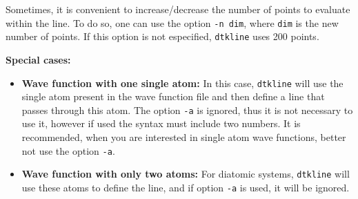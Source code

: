 Sometimes, it is convenient to increase/decrease the number of points to evaluate within the line. To do so, one can use the option \texttt{-n dim}, where \texttt{dim} is the new number of points. If this option is not especified, \texttt{dtkline} uses 200 points.

\textbf{Special cases:}
\begin{itemize}
   \item \textbf{Wave function with one single atom:} In this case, \texttt{dtkline} will use the single atom present in the wave function file and then define a line that passes through this atom. The option \texttt{-a} is ignored, thus it is not necessary to use it, however if used the syntax must include two numbers. It is recommended, when you are interested in single atom wave functions, better not use the option \texttt{-a}.
   \item \textbf{Wave function with only two atoms:} For diatomic systems, \texttt{dtkline} will use these atoms to define the line, and if option \texttt{-a} is used, it will be ignored. 
\end{itemize}

